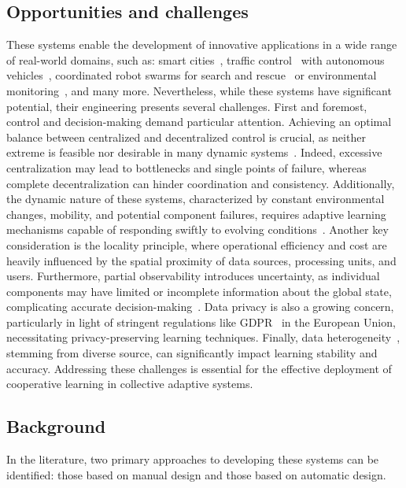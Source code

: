 \documentclass[12pt]{article}
\begin{document}
\subsection{Opportunities and challenges}
These systems enable the development of innovative applications in a wide range of real-world domains, such as: 
 smart cities~\cite{DBLP:conf/icse/IftikharRBW017}, 
 traffic control~\cite{DBLP:journals/tits/ChuWCL20,DBLP:books/sp/Muller2011/ProthmannTBHMS11} 
 with autonomous vehicles~\cite{DBLP:journals/corr/BojarskiTDFFGJM16}, 
 coordinated robot swarms for search and rescue~\cite{DBLP:journals/ijon/ZhouLLXS21} 
 or environmental monitoring~\cite{DBLP:conf/acsos/AguzziVE23}, and many more.
%
Nevertheless, while these systems have significant potential, their engineering 
 presents several challenges.
%
First and foremost, control and decision-making demand particular attention.
%
Achieving an optimal balance between centralized and decentralized control is crucial, 
 as neither extreme is feasible nor desirable in many dynamic systems~\cite{DBLP:conf/coordination/CasadeiPVN19}. 
% 
Indeed, excessive centralization may lead to bottlenecks and single points of failure, 
 whereas complete decentralization can hinder coordination and consistency.
%
Additionally, the dynamic nature of these systems, characterized by constant 
 environmental changes, mobility, and potential component failures, requires adaptive 
 learning mechanisms capable of responding swiftly 
 to evolving conditions~\cite{DBLP:journals/swarm/PrasetyoMF19}.
%
Another key consideration is the locality principle, where operational efficiency and cost 
 are heavily influenced by the spatial proximity of data sources, processing units, and users.
%
Furthermore, partial observability introduces uncertainty, as individual components may have 
 limited or incomplete information about the global state, complicating accurate 
 decision-making~\cite{DBLP:conf/uai/HeDB22}.
%
Data privacy is also a growing concern, particularly in light of stringent regulations like GDPR~\cite{GDPR}
 in the European Union, necessitating privacy-preserving learning techniques.
%
Finally, data heterogeneity~\cite{DBLP:journals/fgcs/MaZLCQ22,DBLP:journals/ijon/ZhuXLJ21},
 stemming from diverse source, can significantly impact learning stability and accuracy.
%
Addressing these challenges is essential for the effective deployment of cooperative learning 
 in collective adaptive systems.

\subsection{Background}
In the literature, two primary approaches to developing these systems can be identified:
 those based on manual design and those based on automatic design.
\end{document}
